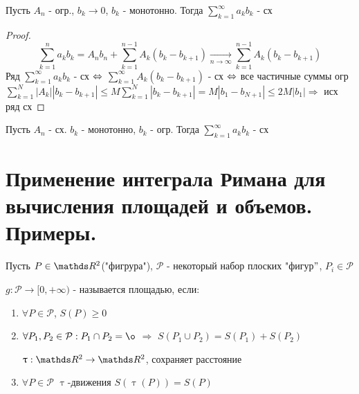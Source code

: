 \documentclass[12pt, fleqn]{article}
\begin{document}
\begin{Property}[3]
\begin{Property}[4]
\begin{Property}[2, аддитивность]
\begin{Proof}
\begin{theorem} 
    Пусть $A_n$ - огр., $b_k \rightarrow 0$, $b_k$ - монотонно. Тогда $\sum\limits_{k=1}^\infty a_k b_k$ - сх
\end{theorem}

\begin{proof}
    \[\sum\limits_{k=1}^n a_k b_k = A_n b_n + \sum\limits_{k=1}^{n-1} A_k (b_k - b_{k+1}) \underset{n \rightarrow \infty}{\rightarrow} \sum\limits_{k=1}^{n-1} A_k (b_k - b_{k+1})\]
    Ряд $\sum\limits_{k=1}^\infty a_k b_k$ - сх $\Leftrightarrow$ $\sum\limits_{k=1}^\infty A_k (b_k - b_{k+1})$ - сх $\Leftrightarrow$ все частичные суммы огр
    \\
    $\sum\limits_{k=1}^N |A_k| |b_k - b_{k+1}| \leqslant M \sum\limits_{k=1}^N |b_k - b_{k+1}| = M |b_1 - b_{N+1}| \leqslant 2 M |b_1| \Rightarrow$ исх ряд сх
\end{proof}

\begin{theorem} 
    Пусть $A_n$ - сх. $b_k$ - монотонно, $b_k$ - огр. Тогда $\sum\limits_{k=1}^\infty a_k b_k$ - сх
\end{theorem}

\newpage
\section{Применение интеграла Римана для вычисления площадей и объемов. Примеры.}

\begin{definition} [школьное]
    Пусть $P \in \R^2$("фигрура"), $\mathcal{P}$ - некоторый набор плоских "фигур$"$, $P_i \in \mathcal{P}$
    
    $g: \mathcal{P} \rightarrow [0, +\infty)$ - называется площадью, если: 
    \begin{enumerate}
        \item $\forall P \in \mathcal{P}$, $S(P) \geqslant 0$
        \item $\forall P_1, P_2 \in \mathcal{P}: P_1 \cap P_2 = \o$ $\Rightarrow$ $S(P_1 \cup P_2)=S(P_1)+S(P_2)$
        \begin{definition}
            $\uptau: \R^2 \rightarrow \R^2$, сохраняет расстояние
        \end{definition}
        \item $\forall P \in \mathcal{P}$ $\uptau$-движения $S(\uptau(P))=S(P)$
    \end{enumerate}
\end{definition}


\end{Proof}
\end{Property}
\end{Property}
\end{Property}
\end{document}

